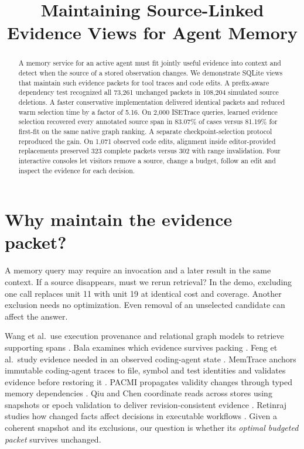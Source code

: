 \documentclass[conference]{IEEEtran}
\title{Maintaining Source-Linked Evidence Views for Agent Memory}
\author{}
\begin{document}
\maketitle
\begin{abstract}
A memory service for an active agent must fit jointly useful evidence into context and detect when the source of a stored observation changes. We demonstrate SQLite views that maintain such evidence packets for tool traces and code edits. A prefix-aware dependency test recognized all 73,261 unchanged packets in 108,204 simulated source deletions. A faster conservative implementation delivered identical packets and reduced warm selection time by a factor of 5.16. On 2,000 ISETrace queries, learned evidence selection recovered every annotated source span in 83.07\% of cases versus 81.19\% for first-fit on the same native graph ranking. A separate checkpoint-selection protocol reproduced the gain. On 1,071 observed code edits, alignment inside editor-provided replacements preserved 323 complete packets versus 302 with range invalidation. Four interactive consoles let visitors remove a source, change a budget, follow an edit and inspect the evidence for each decision.

\end{abstract}

\section{Why maintain the evidence packet?}

A memory query may require an invocation and a later result in the same context. If a source disappears, must we rerun retrieval? In the demo, excluding one call replaces unit 11 with unit 19 at identical cost and coverage. Another exclusion needs no optimization. Even removal of an unselected candidate can affect the answer.

Wang et al.\ use execution provenance and relational graph models to retrieve supporting spans \cite{wang}. Bala examines which evidence survives packing \cite{bala}. Feng et al.\ study evidence needed in an observed coding-agent state \cite{feng}. MemTrace anchors immutable coding-agent traces to file, symbol and test identities and validates evidence before restoring it \cite{memtrace}. PACMI propagates validity changes through typed memory dependencies \cite{pacmi}. Qiu and Chen coordinate reads across stores using snapshots or epoch validation to deliver revision-consistent evidence \cite{readboundaries}. Retinraj studies how changed facts affect decisions in executable workflows \cite{changes}. Given a coherent snapshot and its exclusions, our question is whether its \emph{optimal budgeted packet} survives unchanged.
\end{document}
